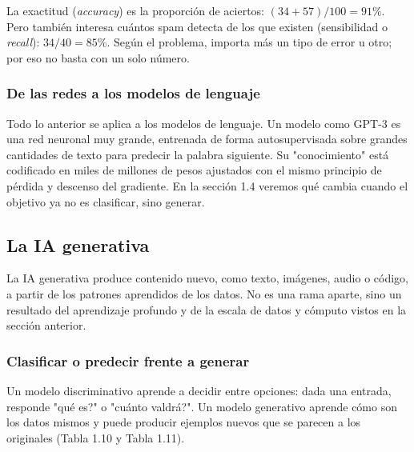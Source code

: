 La exactitud (\textit{accuracy}) es la proporción de aciertos: $(34 + 57) / 100 = 91\%$. Pero también interesa cuántos spam detecta de los que existen (sensibilidad o \textit{recall}): $34 / 40 = 85\%$. Según el problema, importa más un tipo de error u otro; por eso no basta con un solo número.

\subsubsection{De las redes a los modelos de lenguaje}
Todo lo anterior se aplica a los modelos de lenguaje. Un modelo como GPT-3 es una red neuronal muy grande, entrenada de forma autosupervisada sobre grandes cantidades de texto para predecir la palabra siguiente. Su "conocimiento" está codificado en miles de millones de pesos ajustados con el mismo principio de pérdida y descenso del gradiente. En la sección 1.4 veremos qué cambia cuando el objetivo ya no es clasificar, sino generar.

\vspace{0.3cm}

\subsection{La IA generativa}

La IA generativa produce contenido nuevo, como texto, imágenes, audio o código, a partir de los patrones aprendidos de los datos. No es una rama aparte, sino un resultado del aprendizaje profundo y de la escala de datos y cómputo vistos en la sección anterior.

\subsubsection{Clasificar o predecir frente a generar}
Un modelo discriminativo aprende a decidir entre opciones: dada una entrada, responde "\textquestiondown qué es?" o "\textquestiondown cuánto valdrá?". Un modelo generativo aprende cómo son los datos mismos y puede producir ejemplos nuevos que se parecen a los originales (Tabla 1.10 y Tabla 1.11).

